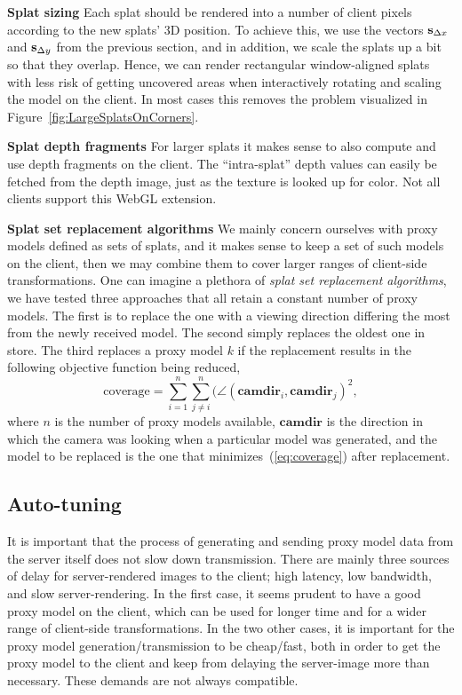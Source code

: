\textbf{Splat sizing} 
Each splat should be rendered into a number of client pixels according to the
new splats' 3D position. To achieve this, we use the vectors $\mathbf{s}_{\Delta x}$
and $\mathbf{s}_{\Delta y}$ from the previous section, and in addition, we scale the
splats up a bit so that they overlap. Hence, we can render rectangular
window-aligned splats with less risk of getting uncovered areas when
interactively rotating and scaling the model on the client. In most cases this
removes the problem visualized in Figure~\ref{fig:LargeSplatsOnCorners}.

\textbf{Splat depth fragments}
For larger splats it makes sense to also compute and use depth fragments on the
client. The ``intra-splat'' depth values can easily be fetched from the depth
image, just as the texture is looked up for color. Not all clients support this
WebGL extension.

\textbf{Splat set replacement algorithms}
We mainly concern ourselves with proxy models defined as sets of splats, and it
makes sense to keep a set of such models on the client, then we may combine them
to cover larger ranges of client-side transformations. One can imagine a plethora of
{\em splat set replacement algorithms}, we have tested three approaches that all
retain a constant number of proxy models. The first is to replace the
one with a viewing direction differing the most from the newly received
model. The second simply replaces the oldest one in store. The third replaces a
proxy model $k$ if the replacement results in the following objective function
being reduced,
\begin{equation}
  \text{coverage} =
  \sum_{i=1}^n
    \sum_{j\neq i}^n 
      ( \angle(\textbf{camdir}_i, \textbf{camdir}_j )^2,
  \label{eq:coverage}
\end{equation}
where $n$ is the number of proxy models available, $\textbf{camdir}$ is the
direction in which the camera was looking when a particular model was generated,
and the model to be replaced is the one that minimizes~(\ref{eq:coverage}) after
replacement.


\subsection{Auto-tuning}
\label{sec:autoTuning}

It is important that the process of generating and sending proxy model data from
the server itself does not slow down transmission.  There are mainly three
sources of delay for server-rendered images to the client; high latency, low
bandwidth, and slow server-rendering.  In the first case, it seems prudent to
have a good proxy model on the client, which can be used for longer time and for
a wider range of client-side transformations.  In the two other cases, it is
important for the proxy model generation/transmission to be cheap/fast, both in order
to get the proxy model to the client and keep from delaying the server-image
more than necessary. These demands are not always compatible.

